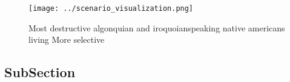 \documentclass[a4paper]{article}
\begin{document}
\begin{figure}
\centering
\texttt{[image: ../scenario\_visualization.png]}
\caption{Most destructive algonquian and iroquoianspeaking native americans living More selective 
}
\end{figure}
 
\subsection{SubSection}
\end{document}
